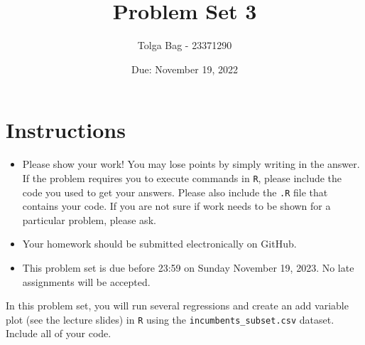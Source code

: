 \documentclass[12pt,letterpaper]{article}
\title{Problem Set 3}
\date{Due: November 19, 2022}
\author{Tolga Bag - 23371290}
\begin{document}
	\maketitle
	\section*{Instructions}
	\begin{itemize}
		\item Please show your work! You may lose points by simply writing in the answer. If the problem requires you to execute commands in \texttt{R}, please include the code you used to get your answers. Please also include the \texttt{.R} file that contains your code. If you are not sure if work needs to be shown for a particular problem, please ask.
	\item Your homework should be submitted electronically on GitHub.
	\item This problem set is due before 23:59 on Sunday November 19, 2023. No late assignments will be accepted.

	\end{itemize}

		\vspace{.25cm}
	
\noindent In this problem set, you will run several regressions and create an add variable plot (see the lecture slides) in \texttt{R} using the \texttt{incumbents\_subset.csv} dataset. Include all of your code.

	\vspace{.5cm}
\end{document}
